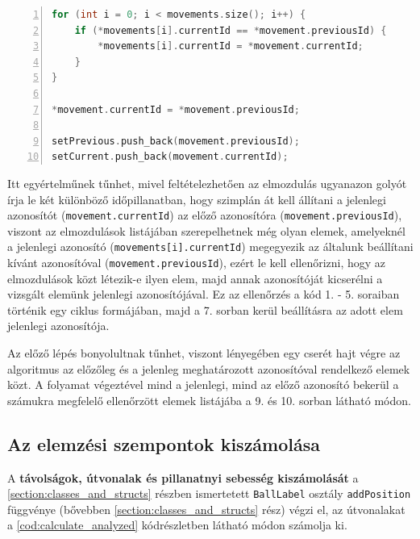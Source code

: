 \begin{codewrapper}
\begin{lstlisting}[language=C++, numbers=left, caption={A piros golyók azonosítójának beállítása.}, label={cod:red_ball_set_switch}]
for (int i = 0; i < movements.size(); i++) {
    if (*movements[i].currentId == *movement.previousId) {
        *movements[i].currentId = *movement.currentId;
    }
}

*movement.currentId = *movement.previousId;

setPrevious.push_back(movement.previousId);
setCurrent.push_back(movement.currentId);
\end{lstlisting}
\end{codewrapper}

\par Itt egyértelműnek tűnhet, mivel feltételezhetően az elmozdulás ugyanazon golyót írja le két különböző időpillanatban, hogy szimplán át kell állítani a jelenlegi azonosítót (\lstinline{movement.currentId}) az előző azonosítóra (\lstinline{movement.previousId}), viszont az elmozdulások listájában szerepelhetnek még olyan elemek, amelyeknél a jelenlegi azonosító (\lstinline{movements[i].currentId}) megegyezik az általunk beállítani kívánt azonosítóval (\lstinline{movement.previousId}), ezért le kell ellenőrizni, hogy az elmozdulások közt létezik-e ilyen elem, majd annak azonosítóját kicserélni a vizsgált elemünk jelenlegi azonosítójával. Ez az ellenőrzés a kód 1. - 5. soraiban történik egy ciklus formájában, majd a 7. sorban kerül beállításra az adott elem jelenlegi azonosítója.
\par Az előző lépés bonyolultnak tűnhet, viszont lényegében egy cserét hajt végre az algoritmus az előzőleg és a jelenleg meghatározott azonosítóval rendelkező elemek közt. A folyamat végeztével mind a jelenlegi, mind az előző azonosító bekerül a számukra megfelelő ellenőrzött elemek listájába a 9. és 10. sorban látható módon.

\subsection{Az elemzési szempontok kiszámolása}
A \textbf{távolságok, útvonalak és pillanatnyi sebesség kiszámolását} a \ref{section:classes_and_structs} részben ismertetett \lstinline{BallLabel} osztály \lstinline{addPosition} függvénye (bővebben \ref{section:classes_and_structs} rész) végzi el, az útvonalakat a \ref{cod:calculate_analyzed} kódrészletben látható módon számolja ki.

